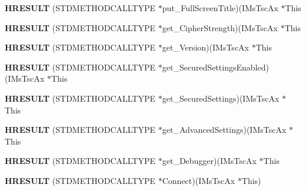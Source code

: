 \begin{DoxyCompactItemize}
\item 
\mbox{\label{struct_i_ms_tsc_ax_vtbl_ab487e19fe37c47c8877f0bafeb886393}} 
{\bfseries H\+R\+E\+S\+U\+LT} (S\+T\+D\+M\+E\+T\+H\+O\+D\+C\+A\+L\+L\+T\+Y\+PE $\ast$put\+\_\+\+Full\+Screen\+Title)(I\+Ms\+Tsc\+Ax $\ast$This
\item 
\mbox{\label{struct_i_ms_tsc_ax_vtbl_a8b740cca9010400bff8fd616e14d25b2}} 
{\bfseries H\+R\+E\+S\+U\+LT} (S\+T\+D\+M\+E\+T\+H\+O\+D\+C\+A\+L\+L\+T\+Y\+PE $\ast$get\+\_\+\+Cipher\+Strength)(I\+Ms\+Tsc\+Ax $\ast$This
\item 
\mbox{\label{struct_i_ms_tsc_ax_vtbl_a49b915bbd977b04b015205b6c339c9ce}} 
{\bfseries H\+R\+E\+S\+U\+LT} (S\+T\+D\+M\+E\+T\+H\+O\+D\+C\+A\+L\+L\+T\+Y\+PE $\ast$get\+\_\+\+Version)(I\+Ms\+Tsc\+Ax $\ast$This
\item 
\mbox{\label{struct_i_ms_tsc_ax_vtbl_a9fcf13df969749aa33964d8f76907c04}} 
{\bfseries H\+R\+E\+S\+U\+LT} (S\+T\+D\+M\+E\+T\+H\+O\+D\+C\+A\+L\+L\+T\+Y\+PE $\ast$get\+\_\+\+Secured\+Settings\+Enabled)(I\+Ms\+Tsc\+Ax $\ast$This
\item 
\mbox{\label{struct_i_ms_tsc_ax_vtbl_aa84b3e5afc0d9487e16edafc7a4f9809}} 
{\bfseries H\+R\+E\+S\+U\+LT} (S\+T\+D\+M\+E\+T\+H\+O\+D\+C\+A\+L\+L\+T\+Y\+PE $\ast$get\+\_\+\+Secured\+Settings)(I\+Ms\+Tsc\+Ax $\ast$This
\item 
\mbox{\label{struct_i_ms_tsc_ax_vtbl_a247a887c3a1341d8528b5524d7e3e6e2}} 
{\bfseries H\+R\+E\+S\+U\+LT} (S\+T\+D\+M\+E\+T\+H\+O\+D\+C\+A\+L\+L\+T\+Y\+PE $\ast$get\+\_\+\+Advanced\+Settings)(I\+Ms\+Tsc\+Ax $\ast$This
\item 
\mbox{\label{struct_i_ms_tsc_ax_vtbl_aeeb6c03ecfe69a4856e475b965e7fe65}} 
{\bfseries H\+R\+E\+S\+U\+LT} (S\+T\+D\+M\+E\+T\+H\+O\+D\+C\+A\+L\+L\+T\+Y\+PE $\ast$get\+\_\+\+Debugger)(I\+Ms\+Tsc\+Ax $\ast$This
\item 
\mbox{\label{struct_i_ms_tsc_ax_vtbl_a8cdbfaaee21521692560890390dc7beb}} 
{\bfseries H\+R\+E\+S\+U\+LT} (S\+T\+D\+M\+E\+T\+H\+O\+D\+C\+A\+L\+L\+T\+Y\+PE $\ast$Connect)(I\+Ms\+Tsc\+Ax $\ast$This)

\end{DoxyCompactItemize}

